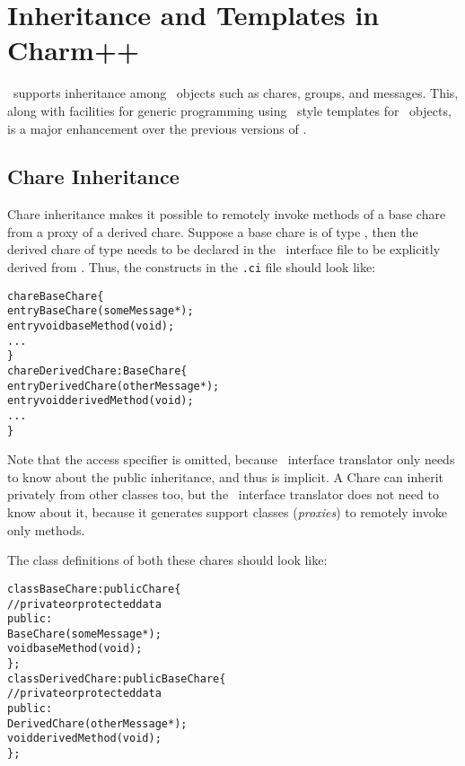 \section{Inheritance and Templates in Charm++}
\label{inheritance and templates}

\charmpp\ supports inheritance among \charmpp\ objects such as
chares, groups, and messages. This, along with facilities for generic
programming using \CC\ style templates for \charmpp\ objects, is a
major enhancement over the previous versions of \charmpp.

\subsection{Chare Inheritance}

Chare inheritance makes it possible to remotely invoke methods of a base
chare  from a proxy of a derived
chare. Suppose a base chare is of type 
, then the derived chare of type  needs to be
declared in the \charmpp\ interface file to be explicitly derived from
. Thus, the constructs in the \texttt{.ci} file should look like:

\begin{alltt}
  chare BaseChare \{
    entry BaseChare(someMessage *);
    entry void baseMethod(void);
    ...
  \}
  chare DerivedChare : BaseChare \{
    entry DerivedChare(otherMessage *);
    entry void derivedMethod(void);
    ...
  \}
\end{alltt}

Note that the access specifier  is omitted, because \charmpp\
interface translator only needs to know about the public inheritance,
and thus \kw{public} is implicit. A Chare can inherit privately from other
classes too, but the \charmpp\ interface translator does not need to know
about it, because it generates support classes ({\em proxies}) to remotely
invoke only \kw{public} methods.

The class definitions of both these chares should look like:

\begin{alltt}
  class BaseChare : public Chare \{
    // private or protected data
    public:
      BaseChare(someMessage *);
      void baseMethod(void);
  \};
  class DerivedChare : public BaseChare \{
    // private or protected data
    public:
      DerivedChare(otherMessage *);
      void derivedMethod(void);
  \};
\end{alltt}

